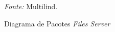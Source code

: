 \begin{figure}[h!]
	\centering
	\caption{Diagrama de Pacotes \textit{Files Server}}
	\begin{tablenotes}[flushleft]
		\centering
		\item \textit{Fonte:} Multilind.
	\end{tablenotes}
	\label{fig10}
\end{figure}

